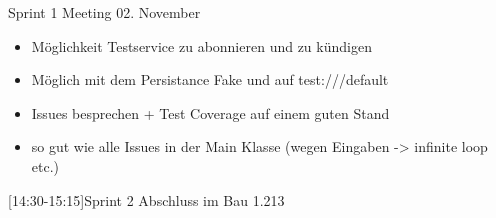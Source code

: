 
\begin{Protokoll}{Sprint 1 Meeting 02. November}
\fehlendEntschuldigt{}
\protokollKopf

\begin{itemize}
  \item Möglichkeit Testservice zu abonnieren und zu kündigen
  \item Möglich mit dem Persistance Fake und auf test:///default
\end{itemize}

\begin{itemize}
  \item Issues besprechen + Test Coverage auf einem guten Stand
  \item so gut wie alle Issues in der Main Klasse (wegen Eingaben -> infinite loop etc.)
\end{itemize}

[14:30-15:15]{Sprint 2 Abschluss im Bau 1.213}



\end{Protokoll}


